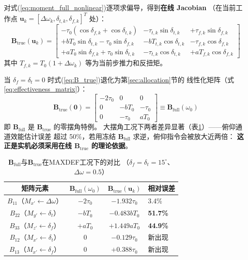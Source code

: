 对式(\ref{eq:moment_full_nonlinear})逐项求偏导，得到\textbf{在线 Jacobian}
（在当前工作点 $\mathbf{u}_k=[\Delta\omega_k,\delta_{t,k},\delta_{f,k}]^T$ 处）：
\begin{equation}
    \boxed{
    \mathbf{B}_{\mathrm{true}}(\mathbf{u}_k) =
    \begin{bmatrix}
        -\tau_0(\cos\delta_{f,k}+\cos\delta_{t,k}) & -\tau_{t,k}\sin\delta_{t,k} & +\tau_{f,k}\sin\delta_{f,k} \\[6pt]
        +b T_0\sin\delta_{t,k} - \tau_0\sin\delta_{f,k} & -b T_{t,k}\cos\delta_{t,k} & -\tau_{f,k}\cos\delta_{f,k} \\[6pt]
        +a T_0\sin\delta_{f,k} + \tau_0\sin\delta_{t,k} & -\tau_{t,k}\cos\delta_{t,k} & +a T_{f,k}\cos\delta_{f,k}
    \end{bmatrix}
    }
    \label{eq:B_true}
\end{equation}
其中 $T_{f,k}=T_0(1+\Delta\omega_k)$ 等为当前步推力和反扭矩。

当 $\delta_f=\delta_t=0$ 时式(\ref{eq:B_true})退化为第\ref{sec:allocation}节的
线性化矩阵（式\ref{eq:effectiveness_matrix}）：
\begin{equation}
    \mathbf{B}_{\mathrm{true}}(\mathbf{0}) =
    \begin{bmatrix}
        -2\tau_0 & 0 & 0 \\
        0 & -b T_0 & -\tau_0 \\
        0 & -\tau_0 & a T_0
    \end{bmatrix}
    \equiv \mathbf{B}_{\mathrm{full}}(\omega_0)
    \label{eq:B_at_zero}
\end{equation}
即 $\mathbf{B}_{\mathrm{full}}$ 是 $\mathbf{B}_{\mathrm{true}}$ 的零摆角特例。
大摆角工况下两者差异显著（表\ref{tab:B_comparison}）——俯仰通道效能估计误差
超过 50\%，若用冻结 $\mathbf{B}_{\mathrm{full}}$ 求逆，俯仰指令会被放大近两倍：
\textbf{这正是实机必须采用在线 $\mathbf{B}_{\mathrm{true}}$ 的理论依据}。

\begin{table}[H]
\centering
\caption{$\mathbf{B}_{\mathrm{full}}$与$\mathbf{B}_{\mathrm{true}}$在MAXDEF工况下的对比
（$\delta_f=\delta_t=15^\circ$、$\Delta\omega=0.5$）}
\label{tab:B_comparison}
\setlength{\tabcolsep}{4pt}
\small
\begin{tabularx}{\textwidth}{c c c X}
\toprule
\textbf{矩阵元素} & $\mathbf{B}_{\mathrm{full}}(\omega_0)$ & $\mathbf{B}_{\mathrm{true}}(\mathbf{u}_k)$ & \textbf{相对误差} \\
\midrule
$B_{11}$（$M_{x'}\leftarrow\Delta\omega$） & $-2\tau_0$ & $-1.932\tau_0$ & 3.4\% \\
$B_{22}$（$M_{y'}\leftarrow\delta_t$） & $-bT_0$ & $-0.483bT_0$ & \textbf{51.7\%} \\
$B_{33}$（$M_{z'}\leftarrow\delta_f$） & $+aT_0$ & $+1.449aT_0$ & \textbf{44.9\%} \\
$B_{12}$（$M_{x'}\leftarrow\delta_t$） & 0 & $-0.129\tau_0$ & 新出现 \\
$B_{13}$（$M_{x'}\leftarrow\delta_f$） & 0 & $+0.388\tau_0$ & 新出现 \\
\bottomrule
\end{tabularx}
\end{table}

